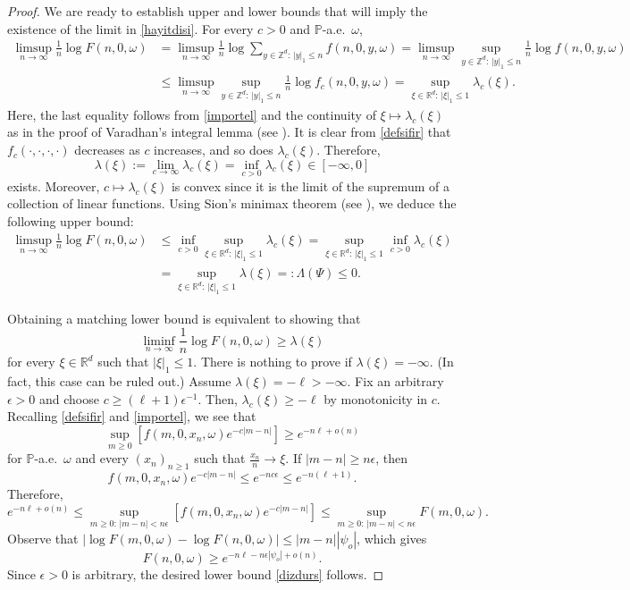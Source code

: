 \documentclass[a4paper]{amsart}
\numberwithin{equation}{section}
\theoremstyle{plain}
\theoremstyle{remark}
\begin{document}
\begin{proof}
	We are ready to establish upper and lower bounds that will imply the existence of the limit in \eqref{hayitdisi}. For every $c>0$ and $\mathbb{P}$-a.e.\ $\omega$,
	\begin{align*}
	\limsup_{n\to\infty}\frac1{n}\log F(n,0,\omega) &= \limsup_{n\to\infty}\frac1{n}\log\sum_{y\in\mathbb{Z}^d:\,|y|_1 \le n} f(n,0,y,\omega) = \limsup_{n\to\infty}\sup_{y\in\mathbb{Z}^d:\,|y|_1 \le n} \frac1{n}\log f(n,0,y,\omega)\\
	&\le \limsup_{n\to\infty}\sup_{y\in\mathbb{Z}^d:\,|y|_1 \le n} \frac1{n}\log f_c(n,0,y,\omega) = \sup_{\xi\in\mathbb{R}^d:\,|\xi|_1 \le 1}\lambda_c(\xi). 
	\end{align*}
	Here, the last equality follows from \eqref{importel} and the continuity of $\xi\mapsto\lambda_c(\xi)$ as in the proof of Varadhan's integral lemma (see \cite[Theorem 4.3.1]{DemZei2010}). It is clear from \eqref{defsifir} that $f_c(\cdot,\cdot,\cdot,\cdot)$ decreases as $c$ increases, and so does $\lambda_c(\xi)$. Therefore, $$\lambda(\xi) := \lim_{c\to\infty}\lambda_c(\xi) = \inf_{c>0}\lambda_c(\xi)\in[-\infty,0]$$ exists. Moreover, $c\mapsto\lambda_c(\xi)$ is convex since it is the limit of the supremum of a collection of linear functions. Using Sion's minimax theorem (see \cite{Kom1988}), we deduce the following upper bound:
	\begin{align*}
	\limsup_{n\to\infty}\frac1{n}\log F(n,0,\omega) &\le \inf_{c>0}\sup_{\xi\in\mathbb{R}^d:\,|\xi|_1 \le 1}\lambda_c(\xi) = \sup_{\xi\in\mathbb{R}^d:\,|\xi|_1 \le 1}\inf_{c>0}\lambda_c(\xi)\\
	&= \sup_{\xi\in\mathbb{R}^d:\,|\xi|_1 \le 1}\lambda(\xi) =: \Lambda(\Psi) \le 0.
	\end{align*}
	
	Obtaining a matching lower bound is equivalent to showing that
	\begin{equation}\label{dizdurs}
	\liminf_{n\to\infty}\frac1{n}\log F(n,0,\omega) \ge \lambda(\xi)
	\end{equation}
	for every $\xi\in\mathbb{R}^d$ such that $|\xi|_1\le 1$. There is nothing to prove if $\lambda(\xi) = - \infty$. (In fact, this case can be ruled out.) Assume $\lambda(\xi) = -\ell > - \infty$. Fix an arbitrary $\epsilon>0$ and choose $c \ge (\ell+1)\epsilon^{-1}$. Then, $\lambda_c(\xi) \ge -\ell$ by monotonicity in $c$. Recalling \eqref{defsifir} and \eqref{importel}, we see that
	$$\sup_{m\ge0}\left[f(m,0,x_n,\omega)e^{-c|m-n|}\right] \ge e^{-n\ell + o(n)}$$
	for $\mathbb{P}$-a.e.\ $\omega$ and every $(x_n)_{n\ge1}$ such that $\frac{x_n}{n}\to\xi$. If $|m-n|\ge n\epsilon$, then $$f(m,0,x_n,\omega)e^{-c|m-n|} \le e^{-nc\epsilon} \le e^{-n(\ell+1)}.$$ Therefore,
	$$e^{-n\ell + o(n)} \le \sup_{m\ge0:\,|m-n|<n\epsilon}\left[f(m,0,x_n,\omega)e^{-c|m-n|}\right] \le \sup_{m\ge0:\,|m-n|<n\epsilon}F(m,0,\omega).$$
	Observe that $|\log F(m,0,\omega) - \log F(n,0,\omega)| \le |m-n||\psi_o|$, which gives
	$$F(n,0,\omega) \ge e^{-n\ell -n\epsilon |\psi_o| + o(n)}.$$
	Since $\epsilon>0$ is arbitrary, the desired lower bound \eqref{dizdurs} follows.
\end{proof}
\end{document}

